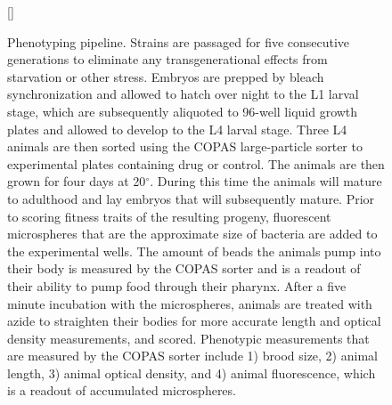 \documentclass[12pt]{article}
\begin{document}
\begin{figure}[h]
\renewcommand{\thefigure}{A.\arabic{figure}}
[\FBwidth]
{\caption[Phenotyping pipeline]{Phenotyping pipeline. Strains are passaged for five consecutive generations to eliminate any transgenerational effects from starvation or other stress. Embryos are prepped by bleach synchronization and allowed to hatch over night to the L1 larval stage, which are subsequently aliquoted to 96-well liquid growth plates and allowed to develop to the L4 larval stage. Three L4 animals are then sorted using the COPAS large-particle sorter to experimental plates containing drug or control. The animals are then grown for four days at 20$^{\circ}$. During this time the animals will mature to adulthood and lay embryos that will subsequently mature. Prior to scoring fitness traits of the resulting progeny, fluorescent microspheres that are the approximate size of bacteria are added to the experimental wells. The amount of beads the animals pump into their body is measured by the COPAS sorter and is a readout of their ability to pump food through their pharynx. After a five minute incubation with the microspheres, animals are treated with azide to straighten their bodies for more accurate length and optical density measurements, and scored. Phenotypic measurements that are measured by the COPAS sorter include 1) brood size, 2) animal length, 3) animal optical density, and 4) animal fluorescence, which is a readout of accumulated microspheres.}\label{Phenotyping}}

\end{figure}
\end{document}
